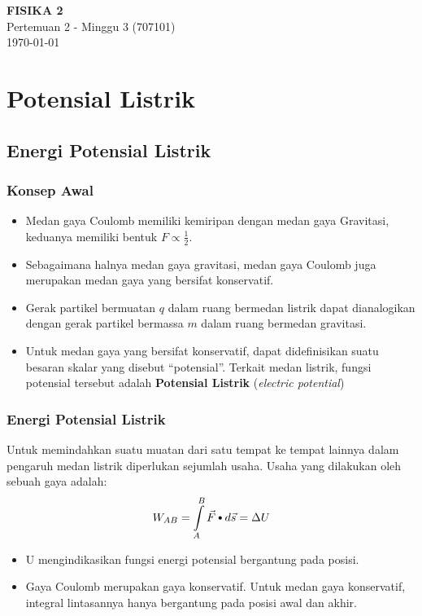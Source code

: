 \documentclass[twocolumn, 11pt]{article}%
\newcommand\sbullet[1][.5]{\mathbin{\ThisStyle{\vcenter{\hbox{%
  \scalebox{#1}{$\SavedStyle\bullet$}}}}}%
}
\begin{document}
\begin{strip}
  \vspace*{\dimexpr-\stripsep}
  \begin{center}
      \Large\textbf{FISIKA 2}\\
      \large{Pertemuan 2 - Minggu 3 (707101)}\\
      \large{\today}
   \end{center}
\end{strip}

\section{Potensial Listrik}
    \subsection{Energi Potensial Listrik}%
    \subsubsection{Konsep Awal}%
    \begin{itemize}
        \item Medan gaya Coulomb memiliki kemiripan dengan medan gaya Gravitasi, keduanya memiliki bentuk $\displaystyle F \propto\frac12$.
        \item Sebagaimana halnya medan gaya gravitasi, medan gaya Coulomb juga merupakan medan gaya yang bersifat konservatif.
        \item Gerak partikel bermuatan $q$ dalam ruang bermedan listrik dapat dianalogikan dengan gerak partikel bermassa $m$ dalam ruang bermedan gravitasi.
        \item Untuk medan gaya yang bersifat konservatif, dapat didefinisikan suatu besaran skalar yang disebut “potensial”. Terkait medan listrik, fungsi potensial tersebut adalah \textbf{Potensial Listrik} (\textit{electric potential})
    \end{itemize}

    \subsubsection{Energi Potensial Listrik}%
     Untuk memindahkan suatu muatan dari satu tempat ke tempat lainnya dalam pengaruh medan listrik diperlukan sejumlah usaha. Usaha yang dilakukan oleh sebuah gaya adalah:
     \[W_{AB}=\int\limits_A^B \vec F\sbullet[.75]d\vec s=\Delta U\]

    \begin{itemize}
        \item U mengindikasikan fungsi energi potensial bergantung pada posisi.
        \item Gaya Coulomb merupakan gaya konservatif. Untuk medan gaya konservatif, integral lintasannya hanya bergantung pada posisi awal dan akhir.
    \end{itemize}
\end{document}
